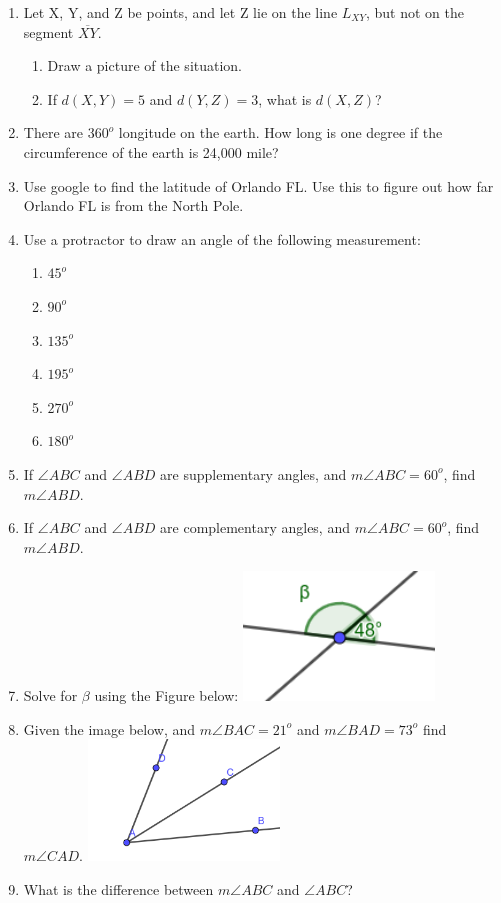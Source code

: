 \documentclass{article}
\begin{document}
\begin{multicols}{2}
\begin{enumerate}
\item Let X, Y, and Z be points, and let Z lie on the line $L_{XY}$, but not on the segment $\overline{XY}$.
\begin{enumerate}
	\item Draw a picture of the situation.
	\item If $d(X,Y)=5$ and $d(Y,Z)=3$, what is $d(X,Z)$?
\end{enumerate}
\item There are $360^o$ longitude on the earth.  How long is one degree if the circumference of the earth is 24,000 mile?
\item Use google to find the latitude of Orlando FL.  Use this to figure out how far Orlando FL is from the North Pole.
\item Use a protractor to draw an angle of the following measurement:
\begin{enumerate}
	\item $45^o$
	\item $90^o$
	\item $135^o$
	\item $195^o$
	\item $270^o$
	\item $180^o$
\end{enumerate}
\item If $\angle ABC$ and $\angle ABD$ are supplementary angles, and $m\angle ABC = 60^o$, find $m\angle ABD$.
\item If $\angle ABC$ and $\angle ABD$ are complementary angles, and $m\angle ABC = 60^o$, find $m\angle ABD$.
\item Solve for $\beta$ using the Figure below:
\includegraphics[width=2in]{geom-test1-review-img1.png}
\item Given the image below, and $m\angle BAC = 21^o$ and $m\angle BAD = 73^o$ find $m\angle CAD$.
\includegraphics[width=2in]{geom-test1-review-img2.png}
\item What is the difference between $m\angle ABC$ and $\angle ABC$?
\end{enumerate}
\end{multicols}
\end{document}
